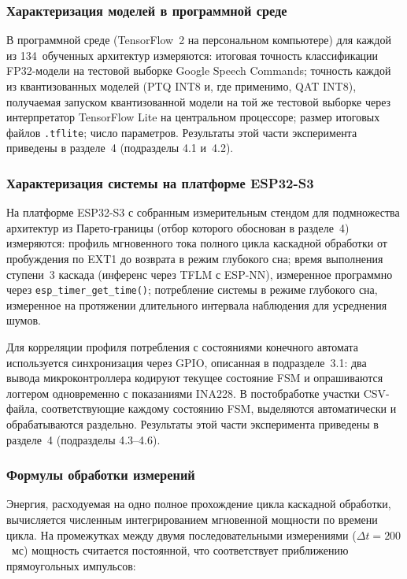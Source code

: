 \subsubsection{Характеризация моделей в программной среде}

В программной среде (TensorFlow~2 на персональном компьютере)
для каждой из 134~обученных архитектур измеряются: итоговая
точность классификации FP32-модели на тестовой выборке Google
Speech Commands; точность каждой из квантизованных моделей
(PTQ INT8 и, где применимо, QAT INT8), получаемая запуском
квантизованной модели на той же тестовой выборке через
интерпретатор TensorFlow Lite на центральном процессоре; размер
итоговых файлов \texttt{.tflite}; число параметров. Результаты
этой части эксперимента приведены в разделе~4 (подразделы 4.1
и~4.2).

\subsubsection{Характеризация системы на платформе ESP32-S3}

На платформе ESP32-S3 с собранным измерительным стендом для
подмножества архитектур из Парето-границы (отбор которого
обоснован в разделе~4) измеряются: профиль мгновенного тока
полного цикла каскадной обработки от пробуждения по EXT1 до
возврата в режим глубокого сна; время выполнения ступени~3
каскада (инференс через TFLM с ESP-NN), измеренное программно
через \texttt{esp\_timer\_get\_time()}; потребление системы в
режиме глубокого сна, измеренное на протяжении длительного
интервала наблюдения для усреднения шумов.

Для корреляции профиля потребления с состояниями конечного
автомата используется синхронизация через GPIO, описанная в
подразделе~3.1: два вывода микроконтроллера кодируют текущее
состояние FSM и опрашиваются логгером одновременно с
показаниями INA228. В постобработке участки CSV-файла,
соответствующие каждому состоянию FSM, выделяются автоматически
и обрабатываются раздельно. Результаты этой части эксперимента
приведены в разделе~4 (подразделы 4.3--4.6).

\subsubsection{Формулы обработки измерений}

Энергия, расходуемая на одно полное прохождение цикла каскадной
обработки, вычисляется численным интегрированием мгновенной
мощности по времени цикла. На промежутках между двумя
последовательными измерениями ($\Delta t = 200$~мс) мощность
считается постоянной, что соответствует приближению
прямоугольных импульсов:

